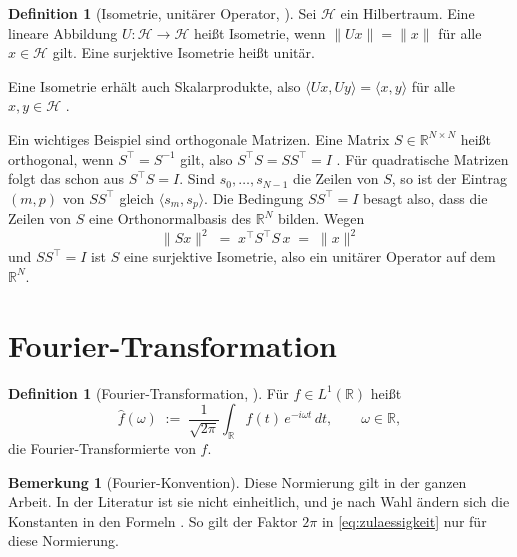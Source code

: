 \documentclass[a4paper,11pt,bibliography=totoc,listof=totoc,headinclude=true,cleardoublepage=empty,oneside]{scrbook}
\theoremstyle{plain}
\theoremstyle{definition}
\newtheorem{Definition}[Satz]{Definition}
\newtheorem{Bemerkung}[Satz]{Bemerkung}
\newcommand{\R}{\mathbb{R}}
\newcommand{\scal}[2]{\langle #1, #2 \rangle}
\newcommand{\norm}[1]{\lVert #1 \rVert}
\begin{document}
\begin{Definition}[Isometrie, unitärer Operator, {\cite[Def.~27.6, Def.~27.7]{serov}}] %
\label{def:isometrie}
Sei $\mathcal H$ ein Hilbertraum. Eine lineare Abbildung
$U\colon \mathcal H \to \mathcal H$ hei\ss{}t Isometrie, wenn
$\norm{Ux} = \norm{x}$ für alle $x \in \mathcal H$ gilt. Eine surjektive
Isometrie hei\ss{}t unitär.
\end{Definition}

Eine Isometrie erhält auch Skalarprodukte, also
$\scal{Ux}{Uy} = \scal{x}{y}$ für alle $x,y\in\mathcal H$
\cite[Übung~27.2, Bem.~27.8]{serov}. %

Ein wichtiges Beispiel sind orthogonale Matrizen. Eine Matrix
$S\in\R^{N\times N}$ hei\ss t orthogonal, wenn $S^\top = S^{-1}$ gilt, also
$S^\top S = SS^\top = I$ \cite[Übung~16.5]{serov}. %
\label{def:orthogonale-matrix}%
Für quadratische Matrizen folgt das schon aus $S^\top S = I$. Sind
$s_0,\dots,s_{N-1}$ die Zeilen von $S$, so ist der Eintrag $(m,p)$ von
$SS^\top$ gleich $\scal{s_m}{s_p}$. Die Bedingung $SS^\top = I$ besagt also,
dass die Zeilen von $S$ eine Orthonormalbasis des $\R^N$ bilden. Wegen
\[
  \norm{Sx}^2 \;=\; x^\top S^\top S\,x \;=\; \norm{x}^2
\]
und $SS^\top = I$ ist $S$ eine surjektive Isometrie, also ein unitärer
Operator auf dem $\R^N$.

\section{Fourier-Transformation}
\label{sec:fourier-plancherel}

\begin{Definition}[Fourier-Transformation, {\cite[Kap.~2.2]{blatter}}] %
\label{def:fourier}
Für $f\in L^1(\R)$ hei\ss t
\[
  \hat f(\omega) \;:=\; \frac{1}{\sqrt{2\pi}}\int_\R f(t)\,e^{-i\omega t}\,dt,
  \qquad \omega\in\R ,
\]
die Fourier-Transformierte von $f$.
\end{Definition}

\begin{Bemerkung}[Fourier-Konvention]
\label{bem:fourier-konvention}
Diese Normierung gilt in der ganzen Arbeit. In der Literatur ist sie nicht
einheitlich, und je nach Wahl ändern sich die Konstanten in den Formeln
\cite[Kap.~2.2]{blatter}. %
So gilt der Faktor $2\pi$ in \eqref{eq:zulaessigkeit} nur für diese Normierung.
\end{Bemerkung}
\end{document}
